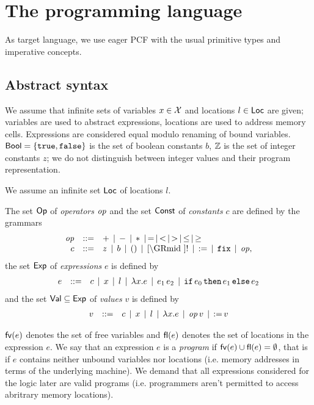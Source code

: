 \documentclass[12pt,a4paper]{report}
\begin{document}

\chapter{The programming language}

As target language, we use eager PCF with the usual primitive types and imperative concepts.



\section{Abstract syntax}

We assume that infinite sets of variables $x \in \mathcal{X}$ and locations $l \in \mathsf{Loc}$ are given;
variables are used to abstract expressions, locations are used to address memory cells.
Expressions are considered equal modulo renaming of bound variables.
$\mathsf{Bool}=\{\mathtt{true},\mathtt{false}\}$ is the set of boolean constants $b$, $\mathbb Z$ is the set of integer
constants $z$; we do not distinguish between integer values and their program representation.

We assume an infinite set $\mathsf{Loc}$ of locations $l$.

\begin{definition}[Expressions]
  The set $\mathsf{Op}$ of {\em operators} $\mathit{op}$ and the set $\mathsf{Const}$ of {\em constants} $c$
  are defined by the grammars
  \[\GRbeg
    \op \GRis + \GRmid - \GRmid * \GRmid = \GRmid < \GRmid > \GRmid \le \GRmid \ge \\
    c \GRis z \GRmid b \GRmid \unit \GRmid \cref \GRmid !
             \GRmid \assign \GRmid \fix \GRmid \op,
  \GRend\]
  the set $\mathsf{Exp}$ of {\em expressions} $e$ is defined by
  \[\begin{array}{rrlll}
    e & ::= & c \,\mid\, x \,\mid\, l \,\mid\, \lambda x.e \,\mid\, e_1\,e_2
           \,\mid\, \mathtt{if}\,e_0\,\mathtt{then}\,e_1\,\mathtt{else}\,e_2
  \end{array}\]
  and the set $\mathsf{Val} \subseteq \mathsf{Exp}$ of {\em values} $v$ is defined by
  \[\begin{array}{rrlll}
    v & ::= & c \,\mid\, x \,\mid\, l \,\mid\, \lambda x.e \,\mid\, \mathit{op}\,v \,\mid\, \mathtt{:=}\,v
  \end{array}\]
\end{definition}

$\mathsf{fv}(e)$ denotes the set of free variables and $\mathsf{fl}(e)$ denotes the set of locations in the
expression $e$. We say that an expression $e$ is a {\em program} if $\mathsf{fv}(e)\cup\mathsf{fl}(e)=\emptyset$,
that is if $e$ contains neither unbound variables nor
locations (i.e. memory addresses in terms of the underlying machine). We demand that all expressions
considered for the logic later are valid programs (i.e. programmers aren't permitted to access
abritrary memory locations).
\end{document}
